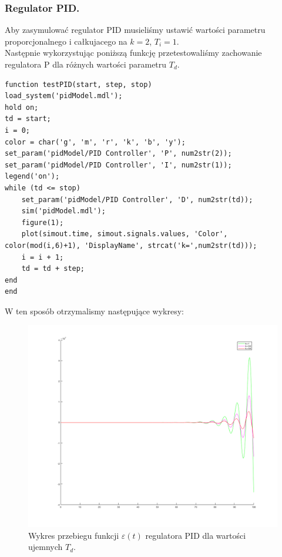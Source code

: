 \documentclass[a4paper,10pt]{article}
\begin{document}
\subsubsection{Regulator PID.}\label{sec:regPID}
Aby zasymulować regulator PID musieliśmy ustawić wartości parametru proporcjonalnego i całkujacego na $k=2$, $T_{i}=1$. \\
Następnie wykorzystując poniższą funkcję przetestowaliśmy zachowanie regulatora P dla różnych wartości parametru $T_{d}$. \\
\begin{lstlisting}[caption=Funkcja testująca regulator PID.]
function testPID(start, step, stop)
load_system('pidModel.mdl');
hold on;
td = start;
i = 0;
color = char('g', 'm', 'r', 'k', 'b', 'y');
set_param('pidModel/PID Controller', 'P', num2str(2));
set_param('pidModel/PID Controller', 'I', num2str(1));
legend('on');
while (td <= stop)
	set_param('pidModel/PID Controller', 'D', num2str(td));
	sim('pidModel.mdl');
	figure(1);
	plot(simout.time, simout.signals.values, 'Color', color(mod(i,6)+1), 'DisplayName', strcat('k=',num2str(td)));
	i = i + 1;
	td = td + step;
end
end
\end{lstlisting}
W ten sposób otrzymalismy następujące wykresy: \\
\begin{figure}[!h]
    \centering
	\includegraphics[width=130mm]{PID-ku.png}
	\caption{Wykres przebiegu funkcji $\varepsilon(t)$ regulatora PID dla wartości ujemnych $T_{d}$.}
    \label{fig:regulatorPIDeu}
\end{figure}
\end{document}
